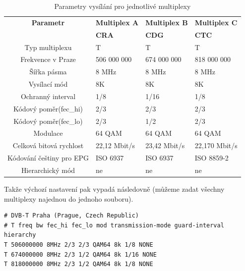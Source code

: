 \begin{table}
\begin{center}
\begin{tabular}{|c|l|l|l|}
\hline
\bf{Parametr} 		& \bf{Multiplex A} 	& \bf{Multiplex B} 	& \bf{Multiplex C} 	\\
			& 	\bf{CRA} 	& 	\bf{CDG} 	& 	\bf{CTC} 	\\
\hline
Typ multiplexu		&	T		&       T		&       T		\\
\hline
Frekvence v Praze	&	506 000 000	&       674 000 000	&       818 000 000	\\
\hline
Šířka pásma		&	8 MHz		&       8 MHz		&       8 MHz		\\
\hline
Vysílací mód		&	8K		&       8K		&       8K		\\
\hline
Ochranný interval 	&	1/8		&       1/16		&       1/8		\\
\hline
Kódový poměr(fec\_hi)	&	2/3		&       2/3		&       2/3		\\
\hline
Kódový poměr(fec\_lo)	&	2/3		&       1/2		&       2/3		\\
\hline
Modulace		&	64 QAM		&       64 QAM		&       64 QAM		\\
\hline
Celková bitová rychlost	&	22,12 Mbit/s	&	23,42 Mbit/s	&	22,170 Mbit/s	\\
\hline
Kódování češtiny pro EPG&	ISO 6937	&	ISO 6937	&	ISO 8859-2	\\
\hline
Hierarchický mód 	&	ne		&       ne		&       ne		\\
\hline
\end{tabular}
\end{center}
\caption{Parametry vysílání pro jednotlivé multiplexy}
\label{tab:mplexy}
\end{table}

\vspace{10pt}

Takže výchozí nastavení pak vypadá následovně (můžeme zadat všechny multiplexy najednou do jednoho souboru).

\vspace{10pt}

\begin{small}
\begin{verbatim}
# DVB-T Praha (Prague, Czech Republic)
# T freq bw fec_hi fec_lo mod transmission-mode guard-interval hierarchy
T 506000000 8MHz 2/3 2/3 QAM64 8k 1/8 NONE
T 674000000 8MHz 2/3 1/2 QAM64 8k 1/16 NONE
T 818000000 8MHz 2/3 1/2 QAM64 8k 1/8 NONE
\end{verbatim}
\end{small}

